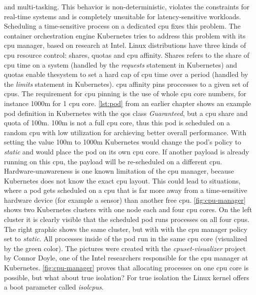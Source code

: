 \documentclass[titlepage]{report}
\begin{document}
and multi-tasking. This behavior is non-deterministic, violates the constraints for real-time systems and is completely unsuitable for latency-sensitive workloads. Scheduling a time-sensitive process on a dedicated \gls{cpu}
fixes this problem. The container orchestration engine Kubernetes tries to address this problem with its \gls{cpu} manager, based on research at Intel\cite{KubernetesCPUManager}. Linux distributions have three kinds
of \gls{cpu} resource control: shares, quotas and \gls{cpu} affinity. Shares refers to the share of \gls{cpu} time on a system (handled by the \emph{requests} statement in Kubernetes) 
and quotas enable thesystem to set a hard cap of \gls{cpu} time over a period (handled by the \emph{limits} statement in Kubernetes)\cite{KubernetesCPUManager}.
\gls{cpu} affinity pins proccesses to a given set of \glspl{cpu}. The requirement for \gls{cpu} pinning is the use of whole \gls{cpu} core numbers, for instance 1000m for 1 \gls{cpu} core.
\autoref{lst:pod} from an earlier chapter shows an example pod definition in Kubernetes with the \gls{qos} class \emph{Guaranteed}, but a \gls{cpu} share and quota of 100m. 100m
is not a full \gls{cpu} core, thus this pod is scheduled on a random \gls{cpu} with low utilization for archieving better overall performance. With setting the value 100m to 1000m Kubernetes would
change the pod's policy to \emph{static} and would place the pod on its own \gls{cpu} core. If another payload is already running on this \gls{cpu}, the payload will be re-scheduled on a different \gls{cpu}.
Hardware-unawareness is one known limitation of the \gls{cpu} manager, because Kubernetes does not know the exact
\gls{cpu} layout. This could lead to situations, where a pod gets scheduled on a \gls{cpu} that is far more away from a time-sensitive hardware device (for example a sensor) than another free \gls{cpu}.
\autoref{fig:cpu-manager} shows two Kubernetes clusters with one node each and four \gls{cpu} cores. On the left cluster it is clearly visible that the scheduled pod runs processes on all four \glspl{cpu}.
The right graphic shows the same cluster, but with with the cpu manager policy set to \emph{static}. All processes inside of the pod run in the same \gls{cpu} core (visualized by the green color).
The pictures were created with the \emph{cpuset-visualizer} project by Connor Doyle, one of the Intel researchers responsible for the cpu manager at Kubernetes\cite{CPUSetVisualizer}.
\autoref{fig:cpu-manager} proves that allocating processes on one \gls{cpu} core is possible, but what about true isolation? For true isolation the Linux kernel offers a boot parameter called \emph{isolcpus}.
\end{document}

